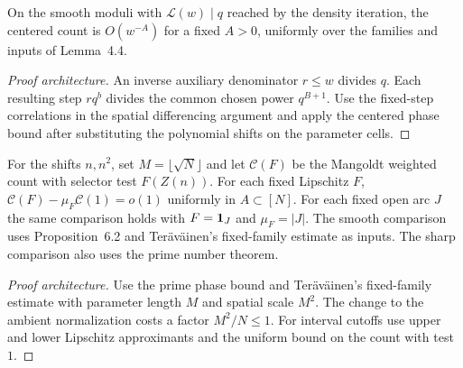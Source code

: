 \begin{lemma}\label{checked-smooth-factors}
\leanok
On the smooth moduli with $\mathcal L(w)\mid q$ reached by the
density iteration, the centered count is $O(w^{-A})$ for a fixed
$A>0$, uniformly over the families and inputs of Lemma~4.4.
\end{lemma}
\begin{proof}[Proof architecture]
\leanok
An inverse auxiliary denominator $r\le w$ divides $q$.
Each resulting step $rq^b$ divides the common chosen power
$q^{B+1}$. Use the fixed-step correlations in the spatial
differencing argument and apply the centered phase bound
after substituting the polynomial shifts on the parameter cells.
\end{proof}

\begin{lemma}\label{checked-ambient-discrete}
\leanok
For the shifts $n,n^2$, set $M=\lfloor\sqrt N\rfloor$ and let
$\mathcal C(F)$ be the Mangoldt weighted count with selector test
$F(Z(n))$. For each fixed Lipschitz $F$,
$\mathcal C(F)-\mu_F\mathcal C(1)=o(1)$ uniformly in $A\subset[N]$.
For each fixed open arc $J$ the same comparison holds with
$F=\mathbf 1_J$ and $\mu_F=|J|$.
The smooth comparison uses Proposition~6.2 and Ter\"av\"ainen's
fixed-family estimate as inputs. The sharp comparison also uses
the prime number theorem.
\end{lemma}
\begin{proof}[Proof architecture]
\leanok
Use the prime phase bound and Ter\"av\"ainen's fixed-family
estimate with parameter length $M$ and spatial scale $M^2$.
The change to the ambient normalization costs a factor $M^2/N\le1$.
For interval cutoffs use upper and lower Lipschitz approximants and
the uniform bound on the count with test $1$.
\end{proof}

